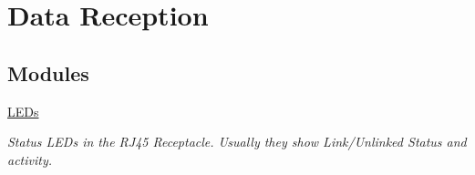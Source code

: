 \hypertarget{group__data__reception}{}\section{Data Reception}
\label{group__data__reception}
\subsection*{Modules}
\begin{DoxyCompactItemize}
\item 
\mbox{\hyperlink{group__leds}{L\+E\+Ds}}
\begin{DoxyCompactList}\small\item\em Status L\+E\+Ds in the R\+J45 Receptacle. Usually they show Link/\+Unlinked Status and activity. \end{DoxyCompactList}\end{DoxyCompactItemize}
